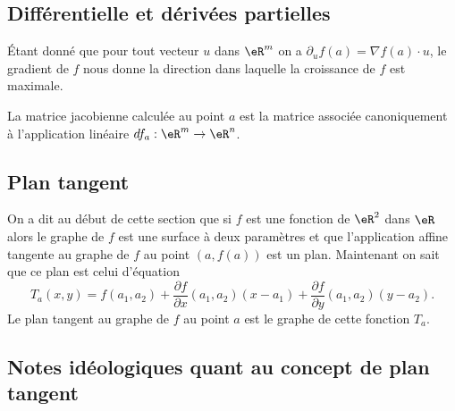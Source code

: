 \subsection{Différentielle et dérivées partielles}

Étant donné que pour tout vecteur \( u\) dans \( \eR^m\) on a \( \partial_uf(a)=\nabla f(a)\cdot u\), le gradient de \( f\) nous donne la direction dans laquelle la croissance de \( f\) est maximale.

La matrice jacobienne calculée au point \( a\) est la matrice associée canoniquement à l'application linéaire \( df_a:\eR^m\to\eR^n\).

\subsection{Plan tangent}

On a dit au début de cette section que si \( f\) est une fonction de \( \eR^2\) dans \( \eR\) alors le graphe de \( f\) est une surface à deux paramètres et que l'application affine tangente au graphe de \( f\) au point \( (a, f(a))\) est un plan. Maintenant on sait que ce plan est celui d'équation
\begin{equation}
	T_a(x,y)=f(a_1,a_2)+\frac{ \partial f }{ \partial x }(a_1,a_2)(x-a_1)+\frac{ \partial f }{ \partial y }(a_1,a_2)(y-a_2).
\end{equation}
Le plan tangent au graphe de \( f\) au point \( a\) est le graphe de cette fonction \( T_a\).





\subsection{Notes idéologiques quant au concept de plan tangent}
\label{ssecConceptPlanTag}


